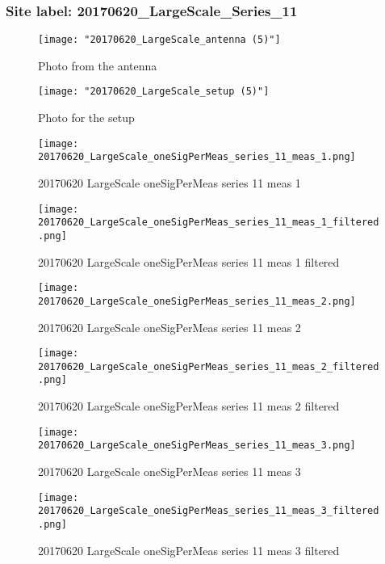 \subsubsection{Site label: 20170620\_LargeScale\_Series\_11}
\begin{figure}[ht] \caption{Photo from the antenna}
\texttt{[image: "20170620\_LargeScale\_antenna (5)"]}\centering\end{figure}
\begin{figure}[ht] \caption{Photo for the setup}
\texttt{[image: "20170620\_LargeScale\_setup (5)"]}\centering\end{figure}
\begin{figure}[ht] \caption{20170620 LargeScale oneSigPerMeas series 11 meas 1}
\texttt{[image: 20170620\_LargeScale\_oneSigPerMeas\_series\_11\_meas\_1.png]}\centering\end{figure}
\begin{figure}[ht] \caption{20170620 LargeScale oneSigPerMeas series 11 meas 1 filtered}
\texttt{[image: 20170620\_LargeScale\_oneSigPerMeas\_series\_11\_meas\_1\_filtered.png]}\centering\end{figure}
\begin{figure}[ht] \caption{20170620 LargeScale oneSigPerMeas series 11 meas 2}
\texttt{[image: 20170620\_LargeScale\_oneSigPerMeas\_series\_11\_meas\_2.png]}\centering\end{figure}
\begin{figure}[ht] \caption{20170620 LargeScale oneSigPerMeas series 11 meas 2 filtered}
\texttt{[image: 20170620\_LargeScale\_oneSigPerMeas\_series\_11\_meas\_2\_filtered.png]}\centering\end{figure}
\begin{figure}[ht] \caption{20170620 LargeScale oneSigPerMeas series 11 meas 3}
\texttt{[image: 20170620\_LargeScale\_oneSigPerMeas\_series\_11\_meas\_3.png]}\centering\end{figure}
\begin{figure}[ht] \caption{20170620 LargeScale oneSigPerMeas series 11 meas 3 filtered}
\texttt{[image: 20170620\_LargeScale\_oneSigPerMeas\_series\_11\_meas\_3\_filtered.png]}\centering\end{figure}
\clearpage
